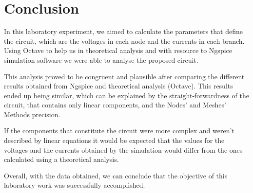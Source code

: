 \section{Conclusion}
\label{sec:conclusion}

In this laboratory experiment, we aimed to calculate the parameters that define the circuit, which are the voltages in each node and the currents in each branch.
Using Octave to help us in theoretical analysis and with resource to Ngspice simulation software we were able to analyse the proposed circuit.

This analysis proved to be congruent and plausible after comparing the different results obtained from Ngspice and theoretical analysis (Octave). This results ended up being similar, which can be explained by the straight-forwardness of the circuit, that contains only linear components, and the Nodes' and Meshes' Methods precision.

If the components that constitute the circuit were more complex and weren't described by linear equations it would be expected that the values for the voltages and the currents obtained by the simulation would differ from the ones calculated using a theoretical analysis.

Overall, with the data obtained, we can conclude that the objective of this laboratory work was successfully accomplished.


